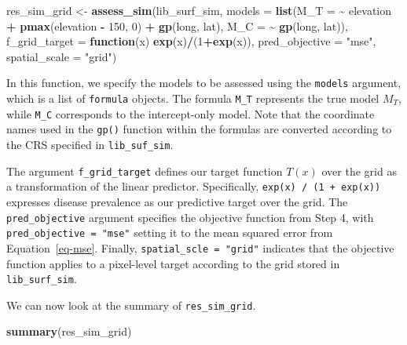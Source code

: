 \documentclass[
  letterpaper,
]{krantz}
\newenvironment{Shaded}{\begin{snugshade}}{\end{snugshade}}
\newcommand{\AttributeTok}[1]{\textcolor[rgb]{0.13,0.29,0.53}{#1}}
\newcommand{\ControlFlowTok}[1]{\textcolor[rgb]{0.13,0.29,0.53}{\textbf{#1}}}
\newcommand{\DecValTok}[1]{\textcolor[rgb]{0.00,0.00,0.81}{#1}}
\newcommand{\FunctionTok}[1]{\textcolor[rgb]{0.13,0.29,0.53}{\textbf{#1}}}
\newcommand{\NormalTok}[1]{#1}
\newcommand{\OtherTok}[1]{\textcolor[rgb]{0.56,0.35,0.01}{#1}}
\newcommand{\SpecialCharTok}[1]{\textcolor[rgb]{0.81,0.36,0.00}{\textbf{#1}}}
\newcommand{\StringTok}[1]{\textcolor[rgb]{0.31,0.60,0.02}{#1}}
\begin{document}
\begin{Shaded}
\begin{Highlighting}[]
\NormalTok{res\_sim\_grid }\OtherTok{\textless{}{-}} \FunctionTok{assess\_sim}\NormalTok{(lib\_surf\_sim,}
                      \AttributeTok{models =} \FunctionTok{list}\NormalTok{(}\AttributeTok{M\_T =} \SpecialCharTok{\textasciitilde{}}\NormalTok{  elevation }\SpecialCharTok{+}
                                             \FunctionTok{pmax}\NormalTok{(elevation }\SpecialCharTok{{-}} \DecValTok{150}\NormalTok{, }\DecValTok{0}\NormalTok{) }\SpecialCharTok{+}
                                             \FunctionTok{gp}\NormalTok{(long, lat),}
                                    \AttributeTok{M\_C =} \SpecialCharTok{\textasciitilde{}} \FunctionTok{gp}\NormalTok{(long, lat)),}
                      \AttributeTok{f\_grid\_target =} \ControlFlowTok{function}\NormalTok{(x) }\FunctionTok{exp}\NormalTok{(x)}\SpecialCharTok{/}\NormalTok{(}\DecValTok{1}\SpecialCharTok{+}\FunctionTok{exp}\NormalTok{(x)),}
                      \AttributeTok{pred\_objective =} \StringTok{"mse"}\NormalTok{,}
                      \AttributeTok{spatial\_scale =} \StringTok{"grid"}\NormalTok{)}
\end{Highlighting}
\end{Shaded}

In this function, we specify the models to be assessed using the
\texttt{models} argument, which is a list of \texttt{formula} objects.
The formula \texttt{M\_T} represents the true model \(M_T\), while
\texttt{M\_C} corresponds to the intercept-only model. Note that the
coordinate names used in the \texttt{gp()} function within the formulas
are converted according to the CRS specified in \texttt{lib\_suf\_sim}.

The argument \texttt{f\_grid\_target} defines our target function
\(T(x)\) over the grid as a transformation of the linear predictor.
Specifically, \texttt{exp(x)\ /\ (1\ +\ exp(x))} expresses disease
prevalence as our predictive target over the grid. The
\texttt{pred\_objective} argument specifies the objective function from
Step 4, with \texttt{pred\_objective\ =\ "mse"} setting it to the mean
squared error from Equation~\ref{eq-mse}. Finally,
\texttt{spatial\_scle\ =\ "grid"} indicates that the objective function
applies to a pixel-level target according to the grid stored in
\texttt{lib\_surf\_sim}.

We can now look at the summary of \texttt{res\_sim\_grid}.

\begin{Shaded}
\begin{Highlighting}[]
\FunctionTok{summary}\NormalTok{(res\_sim\_grid)}
\end{Highlighting}
\end{Shaded}
\end{document}
